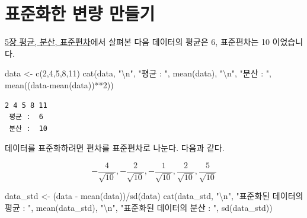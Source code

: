 \documentclass[
  letterpaper,
  DIV=11,
  numbers=noendperiod]{scrreprt}
\newenvironment{Shaded}{\begin{snugshade}}{\end{snugshade}}
\newcommand{\DecValTok}[1]{\textcolor[rgb]{0.68,0.00,0.00}{#1}}
\newcommand{\FunctionTok}[1]{\textcolor[rgb]{0.28,0.35,0.67}{#1}}
\newcommand{\NormalTok}[1]{\textcolor[rgb]{0.00,0.23,0.31}{#1}}
\newcommand{\OtherTok}[1]{\textcolor[rgb]{0.00,0.23,0.31}{#1}}
\newcommand{\SpecialCharTok}[1]{\textcolor[rgb]{0.37,0.37,0.37}{#1}}
\newcommand{\StringTok}[1]{\textcolor[rgb]{0.13,0.47,0.30}{#1}}
\begin{document}
\hypertarget{uxd45cuxc900uxd654uxd55c-uxbcc0uxb7c9-uxb9ccuxb4e4uxae30}{%
\section{표준화한 변량
만들기}\label{uxd45cuxc900uxd654uxd55c-uxbcc0uxb7c9-uxb9ccuxb4e4uxae30}}

\href{https://sungileo.github.io/mine_statistics/01_descriptive_statistics/mean.html}{5장
평균, 분산, 표준편차}에서 살펴본 다음 데이터의 평균은 6, 표준편차는 10
이었습니다.

\begin{Shaded}
\begin{Highlighting}[]
\NormalTok{data }\OtherTok{\textless{}{-}} \FunctionTok{c}\NormalTok{(}\DecValTok{2}\NormalTok{,}\DecValTok{4}\NormalTok{,}\DecValTok{5}\NormalTok{,}\DecValTok{8}\NormalTok{,}\DecValTok{11}\NormalTok{)}
\FunctionTok{cat}\NormalTok{(data, }\StringTok{"}\SpecialCharTok{\textbackslash{}n}\StringTok{"}\NormalTok{,}
    \StringTok{"평균 : "}\NormalTok{, }\FunctionTok{mean}\NormalTok{(data), }\StringTok{"}\SpecialCharTok{\textbackslash{}n}\StringTok{"}\NormalTok{,}
    \StringTok{"분산 : "}\NormalTok{, }\FunctionTok{mean}\NormalTok{((data}\SpecialCharTok{{-}}\FunctionTok{mean}\NormalTok{(data))}\SpecialCharTok{**}\DecValTok{2}\NormalTok{))}
\end{Highlighting}
\end{Shaded}

\begin{verbatim}
2 4 5 8 11 
 평균 :  6 
 분산 :  10
\end{verbatim}

데이터를 표준화하려면 편차를 표준편차로 나눈다. 다음과 같다.

\[-\frac{4}{\sqrt{10}}, -\frac{2}{\sqrt{10}}, -\frac{1}{\sqrt{10}},\frac{2}{\sqrt{10}}, \frac{5}{\sqrt{10}}  \]

\begin{Shaded}
\begin{Highlighting}[]
\NormalTok{data\_std }\OtherTok{\textless{}{-}}\NormalTok{ (data }\SpecialCharTok{{-}} \FunctionTok{mean}\NormalTok{(data))}\SpecialCharTok{/}\FunctionTok{sd}\NormalTok{(data)}
\FunctionTok{cat}\NormalTok{(data\_std, }\StringTok{"}\SpecialCharTok{\textbackslash{}n}\StringTok{"}\NormalTok{,}
    \StringTok{"표준화된 데이터의 평균 : "}\NormalTok{, }\FunctionTok{mean}\NormalTok{(data\_std), }\StringTok{"}\SpecialCharTok{\textbackslash{}n}\StringTok{"}\NormalTok{,}
    \StringTok{"표준화된 데이터의 분산 : "}\NormalTok{, }\FunctionTok{sd}\NormalTok{(data\_std))}
\end{Highlighting}
\end{Shaded}
\end{document}
